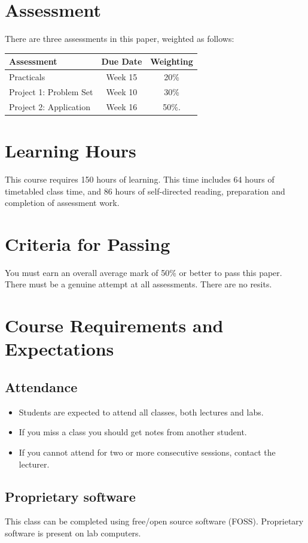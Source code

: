 \documentclass{article}
\begin{document}
\section*{Assessment}
There are three assessments in this paper, weighted as follows:


\begin{tabular}{|l|c|c|}
\hline
Assessment                    & Due Date       & Weighting \\ \hline
Practicals                    & Week 15         & 20\% \\ \hline
Project 1: Problem  Set       & Week 10        & 30\% \\ \hline
Project 2: Application        & Week 16        & 50\%. \\ \hline
\end{tabular}

\section*{Learning Hours}
This course requires 150 hours of learning. This time includes 64 hours of timetabled class time, and 86 
hours of self-directed reading, preparation and completion of assessment work.


\section*{Criteria for Passing}
You must earn an overall average mark of 50\% or better to pass this paper. There must be a genuine 
attempt at all assessments. There are no resits.

\section*{Course Requirements and Expectations}
\subsection*{Attendance}
\begin{itemize}
 \item Students are expected to attend all classes, both lectures and labs.
 \item If you miss a class you should get notes from another student.
 \item If you cannot attend for two or more consecutive sessions, contact the lecturer.
\end{itemize}

\subsection*{Proprietary software}
This class can be completed using free/open source software (FOSS). Proprietary software is present on lab computers. 
\end{document}
